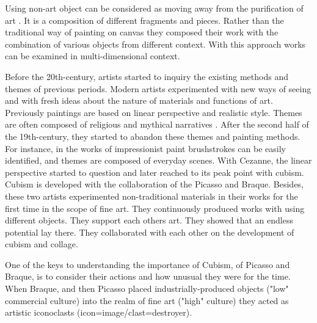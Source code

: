 Using non-art object can be considered as moving away from the purification of art . It is a composition of different fragments and pieces. Rather than the traditional way of painting on canvas they composed their work with the combination of various objects from different context. With this approach works can be examined in multi-dimensional context.


Before the 20th-century, artists started to inquiry the existing methods and themes of previous periods. Modern artists experimented with new ways of seeing and with fresh ideas about the nature of materials and functions of art. Previously paintings are based on linear perspective and realistic style. Themes are often composed of religious and mythical narratives . After the second half of the 19th-century, they started to abandon these themes and painting methods. For instance, in the works of impressionist paint brushstrokes can be easily identified, and themes are composed of everyday scenes. With Cezanne, the linear perspective started to question and later reached to its peak point with cubism. Cubism is developed with the collaboration of the Picasso and Braque. Besides, these two artists experimented non-traditional materials in their works for the first time in the scope of fine art. They continuously produced works with using different objects. They support each others art. They showed that an endless potential lay there. They collaborated with each other on the development of cubism and collage.

One of the keys to understanding the importance of Cubism, of Picasso and Braque, is to consider their actions and how unusual they were for the time. When Braque, and then Picasso placed industrially-produced objects ("low" commercial culture) into the realm of fine art ("high" culture) they acted as artistic iconoclasts (icon=image/clast=destroyer). 


